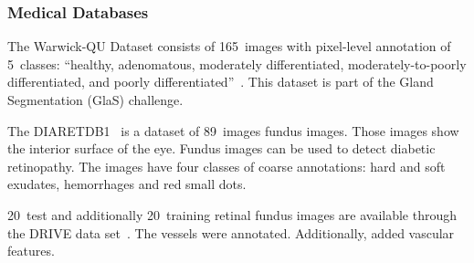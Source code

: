 \subsubsection{Medical Databases}

The Warwick-QU Dataset consists of 165~images with pixel-level annotation of
5~classes: \enquote{healthy, adenomatous, moderately differentiated,
moderately-to-poorly differentiated, and poorly
differentiated}~\cite{coelho2009nuclear}. This dataset is part of the
Gland Segmentation (GlaS) challenge.

The DIARETDB1~\cite{kalesnykiene2014diaretdb1} is a dataset of 89~images fundus
images. Those images show the interior surface of the eye. Fundus images can
be used to detect diabetic retinopathy. The images have four classes of coarse
annotations: hard and soft exudates, hemorrhages and red small dots.

20~test and additionally 20~training retinal fundus images are available
through the DRIVE data set~\cite{staal2004ridge}. The vessels were annotated.
Additionally, \cite{azzopardi2011detection} added vascular features.
